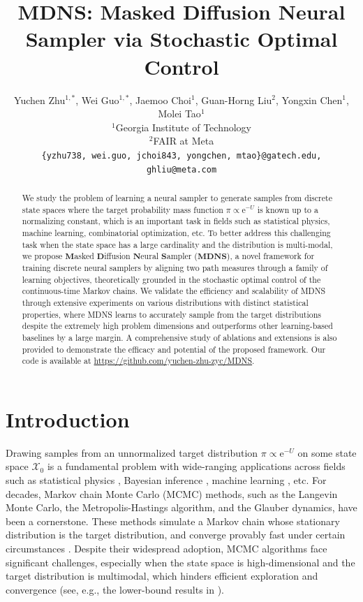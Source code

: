 \documentclass{article}
\title{MDNS: Masked Diffusion Neural Sampler via Stochastic Optimal Control}
\author{
Yuchen Zhu$^{1,*}$, Wei Guo$^{1,*}$, Jaemoo Choi$^{1}$, Guan-Horng Liu$^{2}$, Yongxin Chen$^{1}$, Molei Tao$^{1}$ \\
$^1$Georgia Institute of Technology \\
$^2$FAIR at Meta \\
\texttt{\{yzhu738, wei.guo, jchoi843, yongchen, mtao\}@gatech.edu, ghliu@meta.com}
}
\theoremstyle{remark}
\newcommand{\e}{\mathrm{e}}
\newcommand{\cX}{\mathcal{X}}
\begin{document}
\maketitle


\def\thefootnote{*}
\def\thefootnote{\arabic{footnote}}


\begin{abstract}
    We study the problem of learning a neural sampler to generate samples from discrete state spaces where the target probability mass function $\pi\propto\mathrm{e}^{-U}$ is known up to a normalizing constant, which is an important task in fields such as statistical physics, machine learning, combinatorial optimization, etc. To better address this challenging task when the state space has a large cardinality and the distribution is multi-modal, we propose $\textbf{M}$asked $\textbf{D}$iffusion $\textbf{N}$eural $\textbf{S}$ampler ($\textbf{MDNS}$), a novel framework for training discrete neural samplers by aligning two path measures through a family of learning objectives, theoretically grounded in the stochastic optimal control of the continuous-time Markov chains. We validate the efficiency and scalability of MDNS through extensive experiments on various distributions with distinct statistical properties, where MDNS learns to accurately sample from the target distributions despite the extremely high problem dimensions and outperforms other learning-based baselines by a large margin. A comprehensive study of ablations and extensions is also provided to demonstrate the efficacy and potential of the proposed framework.
    Our code is available at \url{https://github.com/yuchen-zhu-zyc/MDNS}.
\end{abstract}


\section{Introduction}
\label{sec:intro}
%

Drawing samples from an unnormalized target distribution $\pi\propto\e^{-U}$ on some state space $\cX_0$ is a fundamental problem with wide-ranging applications across fields such as statistical physics \cite{landau2014a}, Bayesian inference \cite{gelman2013bayesian}, machine learning \cite{andrieu2003introduction,wainwright2008graphical}, etc. For decades, Markov chain Monte Carlo (MCMC) methods, such as the Langevin Monte Carlo, the Metropolis-Hastings algorithm, and the Glauber dynamics, have been a cornerstone. These methods simulate a Markov chain whose stationary distribution is the target distribution, and converge provably fast under certain circumstances \cite{chewi2022log}. Despite their widespread adoption, MCMC algorithms face significant challenges, especially when the state space is high-dimensional and the target distribution is multimodal, which hinders efficient exploration and convergence (see, e.g., the lower-bound results in \cite{randall2006slow,galvin2006slow,ge2018simulated,he2025query}).
\end{document}
